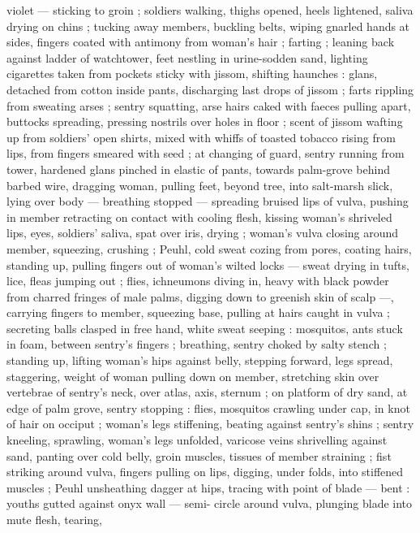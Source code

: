 violet --- sticking to groin ; soldiers walking, thighs opened, heels
lightened, saliva drying on chins ; tucking away members, buckling
belts, wiping gnarled hands at sides, fingers coated with antimony
from woman's hair ; farting ; leaning back against ladder of
watchtower, feet nestling in urine-sodden sand, lighting cigarettes
taken from pockets sticky with jissom, shifting haunches : glans, %
detached from cotton inside pants, discharging last drops of jissom
; farts rippling from sweating arses ; sentry squatting, arse hairs
caked with faeces pulling apart, buttocks spreading, pressing nostrils
over holes in floor ; scent of jissom wafting up from soldiers’ open
shirts, mixed with whiffs of toasted tobacco rising from lips, from
fingers smeared with seed ; at changing of guard, sentry running
from tower, hardened glans pinched in elastic of pants, towards
palm-grove behind barbed wire, dragging woman, pulling feet,
beyond tree, into salt-marsh slick, lying over body --- breathing
stopped --- spreading bruised lips of vulva, pushing in member
retracting on contact with cooling flesh, kissing woman's shriveled
lips, eyes, soldiers’ saliva, spat over iris, drying ; woman's vulva
closing around member, squeezing, crushing ; Peuhl, cold sweat
cozing from pores, coating hairs, standing up, pulling fingers out of
woman's wilted locks --- sweat drying in tufts, lice, fleas jumping out
; flies, ichneumons diving in, heavy with black powder from charred
fringes of male palms, digging down to greenish skin of scalp ---,
carrying fingers to member, squeezing base, pulling at hairs caught
in vulva ; secreting balls clasped in free hand, white sweat seeping :
mosquitos, ants stuck in foam, between sentry's fingers ; breathing,
sentry choked by salty stench ; standing up, lifting woman's hips
against belly, stepping forward, legs spread, staggering, weight of
woman pulling down on member, stretching skin over vertebrae of
sentry's neck, over atlas, axis, sternum ; on platform of dry sand, at
edge of palm grove, sentry stopping : flies, mosquitos crawling
under cap, in knot of hair on occiput ; woman's legs stiffening,
beating against sentry's shins ; sentry kneeling, sprawling, woman's
legs unfolded, varicose veins shrivelling against sand, panting over
cold belly, groin muscles, tissues of member straining ; fist striking
around vulva, fingers pulling on lips, digging, under folds, into
stiffened muscles ; Peuhl unsheathing dagger at hips, tracing with
point of blade --- bent : youths gutted against onyx wall --- semi-
circle around vulva, plunging blade into mute flesh, tearing,
